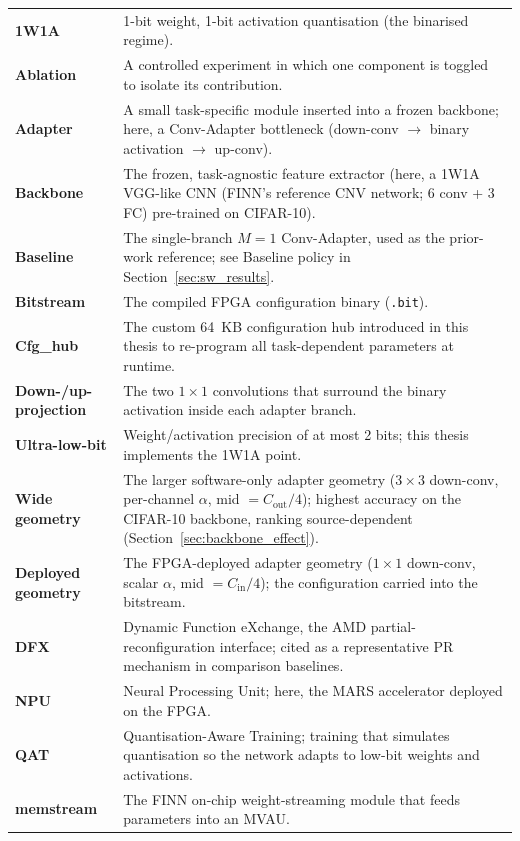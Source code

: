 \documentclass[12pt, a4paper]{report}
\numberwithin{equation}{chapter}
\numberwithin{figure}{chapter}
\numberwithin{table}{chapter}
\numberwithin{algorithm}{chapter}
\begin{document}
\begin{longtable}{p{3.2cm}p{12cm}}
\textbf{1W1A} & 1-bit weight, 1-bit activation quantisation (the binarised regime). \\
\textbf{Ablation} & A controlled experiment in which one component is toggled to isolate its contribution. \\
\textbf{Adapter} & A small task-specific module inserted into a frozen backbone; here, a Conv-Adapter bottleneck (down-conv $\to$ binary activation $\to$ up-conv). \\
\textbf{Backbone} & The frozen, task-agnostic feature extractor (here, a 1W1A VGG-like CNN (FINN's reference CNV network; 6 conv + 3 FC) pre-trained on CIFAR-10). \\
\textbf{Baseline} & The single-branch $M{=}1$ Conv-Adapter, used as the prior-work reference; see Baseline policy in Section~\ref{sec:sw_results}. \\
\textbf{Bitstream} & The compiled FPGA configuration binary (\texttt{.bit}). \\
\textbf{Cfg\_hub} & The custom 64~KB configuration hub introduced in this thesis to re-program all task-dependent parameters at runtime. \\
\textbf{Down-/up-projection} & The two $1{\times}1$ convolutions that surround the binary activation inside each adapter branch. \\
\textbf{Ultra-low-bit} & Weight/activation precision of at most 2 bits; this thesis implements the 1W1A point. \\
\textbf{Wide geometry} & The larger software-only adapter geometry ($3{\times}3$ down-conv, per-channel $\alpha$, mid $=C_{\text{out}}/4$); highest accuracy on the CIFAR-10 backbone, ranking source-dependent (Section~\ref{sec:backbone_effect}). \\
\textbf{Deployed geometry} & The FPGA-deployed adapter geometry ($1{\times}1$ down-conv, scalar $\alpha$, mid $=C_{\text{in}}/4$); the configuration carried into the bitstream. \\
\textbf{DFX} & Dynamic Function eXchange, the AMD partial-reconfiguration interface; cited as a representative PR mechanism in comparison baselines. \\
\textbf{NPU} & Neural Processing Unit; here, the MARS accelerator deployed on the FPGA. \\
\textbf{QAT} & Quantisation-Aware Training; training that simulates quantisation so the network adapts to low-bit weights and activations. \\
\textbf{memstream} & The FINN on-chip weight-streaming module that feeds parameters into an MVAU. \\

\end{longtable}
\end{document}

